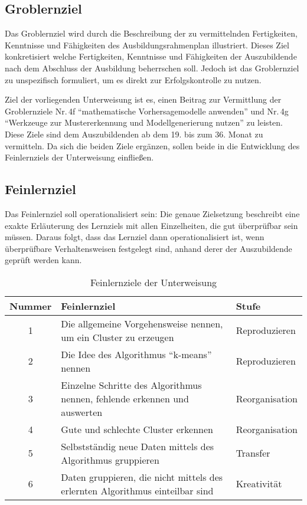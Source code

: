 \subsection{Groblernziel}
Das Groblernziel wird durch die Beschreibung der zu vermittelnden Fertigkeiten, Kenntnisse und Fähigkeiten des Ausbildungsrahmenplan illustriert. Dieses Ziel konkretisiert welche Fertigkeiten, Kenntnisse und Fähigkeiten der Auszubildende nach dem Abschluss der Ausbildung beherrschen soll. Jedoch ist das Groblernziel zu unspezifisch formuliert, um es direkt zur Erfolgskontrolle zu nutzen. 
\par
Ziel der vorliegenden Unterweisung ist es, einen Beitrag zur Vermittlung der Groblernziele Nr.\,4f \enquote{mathematische Vorhersagemodelle anwenden} und Nr.\,4g \enquote{Werkzeuge zur Mustererkennung und Modellgenerierung nutzen} zu leisten. Diese Ziele sind dem Auszubildenden ab dem 19. bis zum 36. Monat zu vermitteln. Da sich die beiden Ziele ergänzen, sollen beide in die Entwicklung des Feinlernziels der Unterweisung einfließen. 
 
\subsection{Feinlernziel}
Das Feinlernziel soll operationalisiert sein: Die genaue Zielsetzung beschreibt eine exakte Erläuterung des Lernziels mit allen Einzelheiten, die gut überprüfbar sein müssen. Daraus folgt, dass das Lernziel dann operationalisiert ist, wenn überprüfbare Verhaltensweisen festgelegt sind, anhand derer der Auszubildende geprüft werden kann. 

\begin{table}[h!]
	\centering
	
	\begin{tabular}{@{}cp{8.0cm}l@{}}
		\toprule
		\textbf{Nummer} & \textbf{Feinlernziel} & \textbf{Stufe} \\ \midrule
		1 & Die allgemeine Vorgehensweise nennen, um ein Cluster zu erzeugen & Reproduzieren\\
		2 & Die Idee des Algorithmus \enquote{k-means} nennen & Reproduzieren \\
		3 & Einzelne Schritte des Algorithmus nennen, fehlende erkennen und auswerten & Reorganisation \\
		4 & Gute und schlechte Cluster erkennen & Reorganisation \\
		5 & Selbstständig neue Daten mittels des Algorithmus gruppieren & Transfer \\ 
		6 & Daten gruppieren, die nicht mittels des erlernten Algorithmus einteilbar sind & Kreativität\\ 

		\bottomrule
	\end{tabular}

	\caption{Feinlernziele der Unterweisung}
	\label{tab:lernziele}
\end{table}

